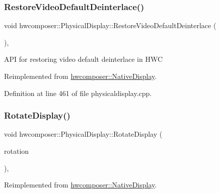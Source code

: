 \subsubsection{\texorpdfstring{Restore\+Video\+Default\+Deinterlace()}{RestoreVideoDefaultDeinterlace()}}
{\footnotesize\ttfamily void hwcomposer\+::\+Physical\+Display\+::\+Restore\+Video\+Default\+Deinterlace (\begin{DoxyParamCaption}{ }\end{DoxyParamCaption})\hspace{0.3cm}{\ttfamily [override]}, {\ttfamily [virtual]}}

A\+PI for restoring video default deinterlace in H\+WC 

Reimplemented from \mbox{\hyperlink{classhwcomposer_1_1NativeDisplay_a686a2906dbe6543523a9f5fb5b4ae3f7}{hwcomposer\+::\+Native\+Display}}.



Definition at line 461 of file physicaldisplay.\+cpp.


\begin{DoxyCode}{0}
\end{DoxyCode}
\mbox{\label{classhwcomposer_1_1PhysicalDisplay_ae9650158e46bd03af1d06aa0e64f3ae6}} 
\subsubsection{\texorpdfstring{Rotate\+Display()}{RotateDisplay()}}
{\footnotesize\ttfamily void hwcomposer\+::\+Physical\+Display\+::\+Rotate\+Display (\begin{DoxyParamCaption}\item[{H\+W\+C\+Rotation}]{rotation }\end{DoxyParamCaption})\hspace{0.3cm}{\ttfamily [override]}, {\ttfamily [virtual]}}



Reimplemented from \mbox{\hyperlink{classhwcomposer_1_1NativeDisplay_aae775a72140fa5ec526d30218b466348}{hwcomposer\+::\+Native\+Display}}.



